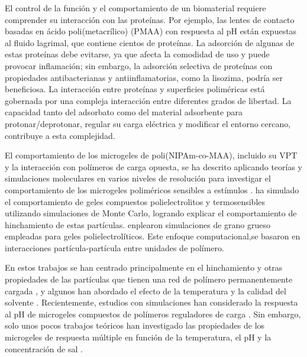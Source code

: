 El control de la funci\'on y el comportamiento de un biomaterial requiere comprender su interacci\'on con las prote\'inas. Por ejemplo, las lentes de contacto basadas en \'acido poli(metacr\'ilico) (PMAA) con respuesta al pH est\'an expuestas al fluido lagrimal, que contiene cientos de prote\'inas. La adsorci\'on de algunas de estas prote\'inas debe evitarse, ya que afecta la comodidad de uso y puede provocar inflamaci\'on; sin embargo, la adsorci\'on selectiva de prote\'inas con propiedades antibacterianas y antiinflamatorias, como la lisozima, podr\'ia ser beneficiosa. 
La interacci\'on entre prote\'inas y superficies polim\'ericas est\'a gobernada por una compleja interacci\'on entre diferentes grados de libertad. La capacidad tanto del adsorbato como del material adsorbente para protonar/deprotonar, regular su carga el\'ectrica y modificar el entorno cercano, contribuye a esta complejidad.


El comportamiento de los microgeles de poli(NIPAm-co-MAA), incluido su VPT y la interacci\'on con pol\'imeros de carga opuesta, se ha descrito aplicando teor\'ias  y simulaciones moleculares en varios niveles de resoluci\'on para investigar el comportamiento de los microgeles polim\'ericos sensibles a est\'imulos \cite{ahualli2016coarse,Landsgesell2019SM}.
\citet{quesada2011gel} ha simulado el comportamiento de geles compuestos  polielectrolitos y termosensibles utilizando  simulaciones de Monte Carlo, logrando explicar el comportamiento de hinchamiento de estas part\'iculas.
\citet{ahualli2016coarse}
enplearon simulaciones de grano grueso empleadas para geles polielectrol\'iticos. Este enfoque computacional,se basaron en interacciones part\'icula-partícula entre unidades de pol\'imero. 

En estos trabajos se han centrado principalmente en el hinchamiento y otras propiedades de las part\'iculas que tienen una red de pol\'imero permanentemente cargada , y algunos han abordado el efecto de la temperatura y la calidad del solvente \cite{Jha2011, QuesadaPerez2013, moncho-jorda2016a, ahualli2016coarse, AdroherBenitez2017PCCP}.
Recientemente, estudios  con simulaciones han considerado la respuesta al pH de microgeles compuestos de pol\'imeros reguladores de carga \cite{Schroeder2015,Rud2017,Sean2018, Hofzumahaus2018,Lu2019}.
Sin embargo, solo unos pocos trabajos te\'oricos han investigado las propiedades de los microgeles de respuesta m\'ultiple en funci\'on de la temperatura, el pH y la concentración de sal  \cite{CaprilesGonzalez2008,polotsky2013collapse}.

